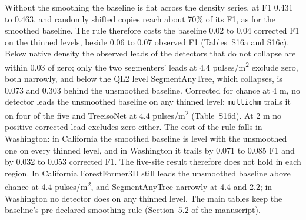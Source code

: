 \documentclass[10pt,a4paper]{article}
\begin{document}
Without the smoothing the baseline is flat across the density series, at F1
0.431 to 0.463, and randomly shifted copies reach about 70\% of its F1, as for
the smoothed baseline. The rule therefore costs the baseline 0.02 to 0.04
corrected F1 on the thinned levels, beside 0.06 to 0.07 observed F1 (Tables~S16a
and S16c). Below native density the observed leads of the detectors that do not
collapse are within 0.03 of zero; only the two segmenters' leads at 4.4
pulses/m\textsuperscript{2} exclude zero, both narrowly, and below the QL2 level SegmentAnyTree,
which collapses, is 0.073 and 0.303 behind the unsmoothed baseline. Corrected
for chance at 4 m, no detector leads the unsmoothed baseline on any thinned
level; \texttt{multichm} trails it on four of the five and TreeisoNet at 4.4 pulses/m\textsuperscript{2}
(Table~S16d). At 2 m no positive corrected lead excludes zero either. The cost
of the rule falls in Washington: in California the smoothed baseline is level
with the unsmoothed one on every thinned level, and in Washington it trails by
0.071 to 0.085 F1 and by 0.032 to 0.053 corrected F1. The five-site result
therefore does not hold in each region. In California ForestFormer3D still leads
the unsmoothed baseline above chance at 4.4 pulses/m\textsuperscript{2}, and SegmentAnyTree
narrowly at 4.4 and 2.2; in Washington no detector does on any thinned level.
The main tables keep the baseline's pre-declared smoothing rule (Section~5.2 of
the manuscript).
\end{document}
